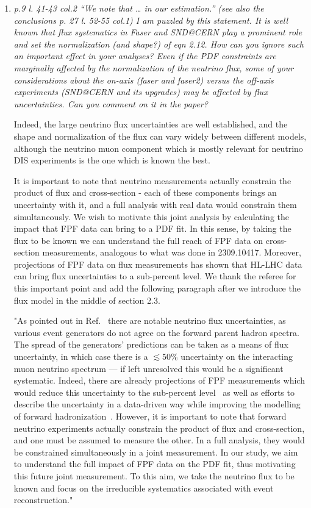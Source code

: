 \documentclass[11pt,a4paper]{article}
\begin{document}
\begin{enumerate}
\item{\it p.9 l. 41-43 col.2 “We note that … in our estimation.” (see also the conclusions p. 27 l. 52-55 col.1) I am puzzled by this statement. It is well known that flux systematics in Faser and SND@CERN play a prominent role and set the normalization (and shape?) of eqn 2.12. How can you ignore such an important effect in your analyses? Even if the PDF constraints are marginally affected by the normalization of the neutrino flux, some of your considerations about the on-axis (faser and faser2) versus the off-axis experiments (SND@CERN and its upgrades) may be affected by flux uncertainties. Can you comment on it in the paper?}

  Indeed, the large neutrino flux uncertainties are well established, and the shape and normalization of the flux can vary widely between different models, although the neutrino muon component which is mostly relevant for neutrino DIS experiments is the one which is known the best.

  It is important to note that neutrino measurements actually constrain the product of flux and cross-section - each of these components brings an uncertainty with it, and a full analysis with real data would constrain them simultaneously. We wish to motivate this joint analysis by calculating the  impact that FPF data can bring to a PDF fit. In this sense, by taking the flux to be known we can understand the full reach of FPF data on cross-section measurements, analogous to what was done in 2309.10417. Moreover, projections of FPF data on flux measurements has shown that HL-LHC data can bring flux uncertainties to a sub-percent level. We thank the referee for this important point and add the following paragraph after we introduce the flux model in the middle of section 2.3. 

  "As pointed out in Ref.~\cite{Kling:2021gos} there are notable neutrino flux uncertainties, as various event generators do not agree on the forward parent hadron spectra. The spread of the generators' predictions can be taken as a means of flux uncertainty, in which case there is a $\lesssim 50\%$ uncertainty on the interacting muon neutrino spectrum --- if left unresolved this would be a significant systematic. Indeed, there are already projections of FPF measurements which would reduce this uncertainty to the sub-percent level~\cite{Kling:2023tgr} as well as efforts to describe the uncertainty in a data-driven way while improving the modelling of forward hadronization~\cite{Fieg:2023kld}. However, it is important to note that forward neutrino experiments actually constrain the product of flux and cross-section, and one must be assumed to measure the other. In a full analysis, they would be constrained simultaneously in a joint measurement. In our study, we aim to understand the full impact of FPF data on the PDF fit, thus motivating this future joint measurement. To this aim, we take the neutrino flux to be known and focus on the irreducible systematics associated with event reconstruction."


\end{enumerate}
\end{document}
